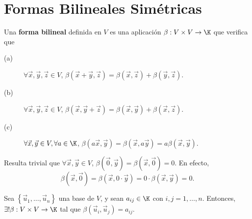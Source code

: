 \chapter{Formas Bilineales Simétricas}
\begin{fdefinition}
\normalfont Una \textbf{forma bilineal} definida en $\displaystyle V $ es una aplicación $\displaystyle \beta : V \times V \to \K $ que verifica que
\begin{description}
\item[(a)] $\displaystyle \forall \vec{x}, \vec{y}, \vec{z} \in V $, $\displaystyle \beta\left(\vec{x}+\vec{y}, \vec{z}\right) = \beta\left(\vec{x}, \vec{z}\right) + \beta\left(\vec{y}, \vec{z}\right) $.
\item[(b)] $\displaystyle \forall \vec{x}, \vec{y}, \vec{z} \in V $, $\displaystyle \beta\left(\vec{x}, \vec{y}+\vec{z}\right) = \beta\left(\vec{x}, \vec{y}\right) + \beta\left(\vec{x}, \vec{z}\right) $.
\item[(c)] $\displaystyle \forall \vec{x}, \vec{y} \in V, \forall a \in \K$, $\displaystyle \beta\left(a\vec{x}, \vec{y}\right) = \beta\left(\vec{x}, a\vec{y}\right) = a \beta\left(\vec{x}, \vec{y}\right) $.
\end{description}
\end{fdefinition}
\begin{observation}
\normalfont Resulta trivial que $\displaystyle \forall \vec{x}, \vec{y} \in V $, $\displaystyle \beta\left(\vec{0}, \vec{y}\right) = \beta\left(\vec{x}, \vec{0}\right) = 0 $. En efecto, 
\[ \beta\left(\vec{x}, \vec{0}\right) = \beta\left(\vec{x}, 0 \cdot \vec{y}\right) = 0 \cdot \beta\left(\vec{x}, \vec{y}\right) = 0 .\]
\end{observation}
\begin{ftheorem}[]
	\normalfont Sea $\displaystyle \left\{ \vec{u}_{1}, \ldots, \vec{u}_{n}\right\}  $ una base de $\displaystyle V $, y sean $\displaystyle a_{ij} \in \K $ con $\displaystyle i,j = 1, \ldots, n $. Entonces, $\displaystyle \exists! \beta : V \times V \to \K $ tal que $\displaystyle \beta\left(\vec{u}_{i}, \vec{u}_{j}\right) = a_{ij} $.
\end{ftheorem}

